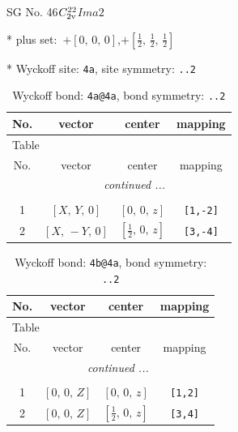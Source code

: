 \documentclass[fleqn,8pt]{jsarticle}
\begin{document}
\setcounter{MaxMatrixCols}{32}

\renewcommand{\tablename}{Table~}
\renewcommand{\figurename}{Figure~}
\begin{center}
\LARGE
SG No. 46\quad$C_{\rm 2v}^{22}$\quad$Ima2$\quad[ orthorhombic ]
\end{center}

* plus set:\,\,\,$+\left[ 0,\, 0,\, 0 \right]$,\quad $+\left[ \frac{1}{2},\, \frac{1}{2},\, \frac{1}{2} \right]$


* Wyckoff site: {\tt 4a}, site symmetry: {\tt ..2}
\renewcommand{\arraystretch}{1.2}
\begin{longtable}{cccc}
\caption{Wyckoff bond: {\tt 4a@4a}, bond symmetry: {\tt ..2}}
 \\
 \hline \hline
No. & vector & center & mapping \\ \hline \endfirsthead

\multicolumn{3}{l}{\tablename\ \thetable{}} \\
 \hline \hline
No. & vector & center & mapping \\ \hline \endhead

 \hline \hline
\multicolumn{3}{r}{\footnotesize\it continued ...} \\ \endfoot

 \hline \hline
\multicolumn{3}{r}{} \\ \endlastfoot

1 & $\left[ X,\, Y,\, 0 \right]$ & $\left[ 0,\, 0,\, z \right]$ & {\tt [1,-2]} \\ \hline
2 & $\left[ X,\, - Y,\, 0 \right]$ & $\left[ \frac{1}{2},\, 0,\, z \right]$ & {\tt [3,-4]} \\
\end{longtable}
\renewcommand{\arraystretch}{1.2}
\begin{longtable}{cccc}
\caption{Wyckoff bond: {\tt 4b@4a}, bond symmetry: {\tt ..2}}
 \\
 \hline \hline
No. & vector & center & mapping \\ \hline \endfirsthead

\multicolumn{3}{l}{\tablename\ \thetable{}} \\
 \hline \hline
No. & vector & center & mapping \\ \hline \endhead

 \hline \hline
\multicolumn{3}{r}{\footnotesize\it continued ...} \\ \endfoot

 \hline \hline
\multicolumn{3}{r}{} \\ \endlastfoot

1 & $\left[ 0,\, 0,\, Z \right]$ & $\left[ 0,\, 0,\, z \right]$ & {\tt [1,2]} \\ \hline
2 & $\left[ 0,\, 0,\, Z \right]$ & $\left[ \frac{1}{2},\, 0,\, z \right]$ & {\tt [3,4]} \\
\end{longtable}
\end{document}
